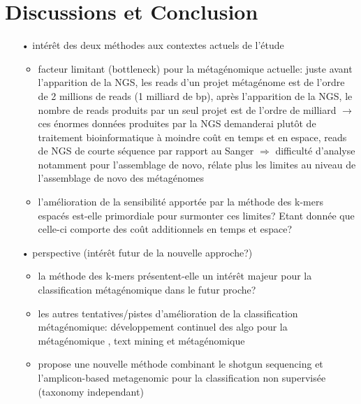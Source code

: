 \section{Discussions et Conclusion}

	\begin{itemize}
		\item[•] intérêt des deux méthodes aux contextes actuels de l'étude
                  \begin{itemize}
                  \item facteur limitant (bottleneck) pour la métagénomique actuelle: juste avant l'apparition de la NGS, les reads d'un projet métagénome est de l'ordre de 2 millions de reads (1 milliard de bp), après l'apparition de la NGS, le nombre de reads produits par un seul projet est de l'ordre de milliard \cite{Kumar2015} $\rightarrow$ ces énormes données produites par la NGS demanderai plutôt de traitement bioinformatique à moindre coût en temps et en espace, reads de NGS de courte séquence par rapport au Sanger $\Rightarrow$ difficulté d'analyse notamment pour l'assemblage de novo, \cite{Kumar2015} rélate plus les limites au niveau de l'assemblage de novo des métagénomes
                  \item l'amélioration de la sensibilité apportée par la méthode des k-mers espacés est-elle primordiale pour surmonter ces limites? Etant donnée que celle-ci comporte des coût additionnels en temps et espace?
                  \end{itemize}
		\item[•] perspective (intérêt futur de la nouvelle approche?)
                  \begin{itemize}                
                  \item la méthode des k-mers présentent-elle un intérêt majeur pour la classification métagénomique dans le futur proche?
                  \item les autres tentatives/pistes d'amélioration de la classification métagénomique: développement continuel des algo pour la métagénomique \cite{Kumar2015}, text mining et métagénomique \cite{Wang2015}
                  \item \cite{Ramazotti2015} propose une nouvelle méthode combinant le shotgun sequencing et l'amplicon-based metagenomic pour la classification non supervisée (taxonomy independant)
                  \end{itemize}
	\end{itemize}